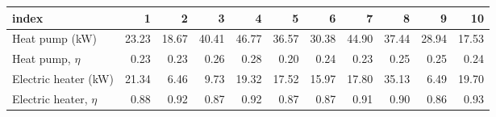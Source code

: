 \begin{tabular}{lrrrrrrrrrr}
\toprule
 index & 1 & 2 & 3 & 4 & 5 & 6 & 7 & 8 & 9 & 10 \\
\midrule
 Heat pump (kW) & 23.23 & 18.67 & 40.41 & 46.77 & 36.57 & 30.38 & 44.90 & 37.44 & 28.94 & 17.53 \\
 Heat pump, $\eta$ & 0.23 & 0.23 & 0.26 & 0.28 & 0.20 & 0.24 & 0.23 & 0.25 & 0.25 & 0.24 \\
 Electric heater (kW) & 21.34 & 6.46 & 9.73 & 19.32 & 17.52 & 15.97 & 17.80 & 35.13 & 6.49 & 19.70 \\
Electric heater, $\eta$ & 0.88 & 0.92 & 0.87 & 0.92 & 0.87 & 0.87 & 0.91 & 0.90 & 0.86 & 0.93 \\
\bottomrule
\end{tabular}
